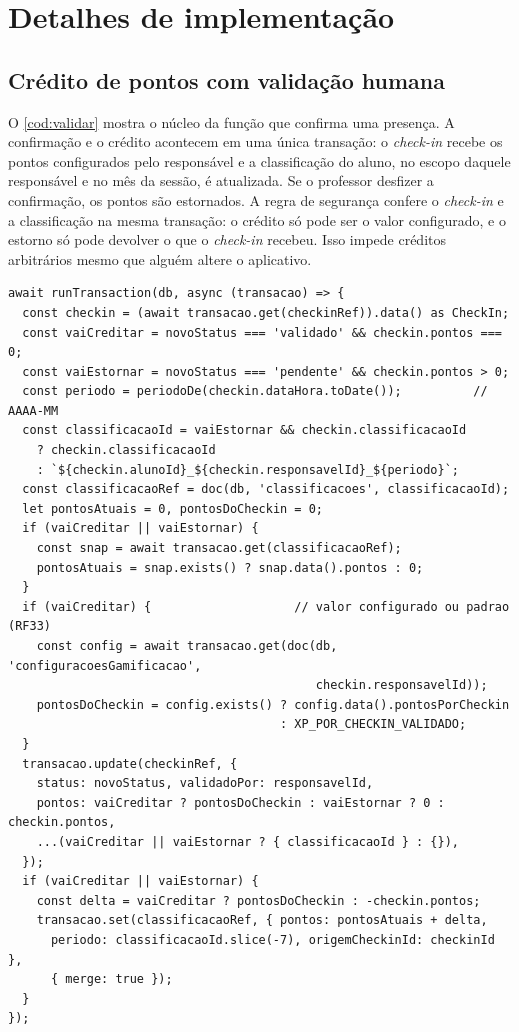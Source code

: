\section{Detalhes de implementação}

\subsection{Crédito de pontos com validação humana}

O \autoref{cod:validar} mostra o núcleo da função que confirma uma
presença. A confirmação e o crédito acontecem em uma única transação: o
\textit{check-in} recebe os pontos configurados pelo responsável e a
classificação do aluno, no escopo daquele responsável e no mês da sessão,
é atualizada. Se o professor desfizer a confirmação, os pontos são
estornados. A regra de segurança confere o \textit{check-in} e a
classificação na mesma transação: o crédito só pode ser o valor
configurado, e o estorno só pode devolver o que o \textit{check-in}
recebeu. Isso impede créditos arbitrários mesmo que alguém altere o
aplicativo.

\begin{codigo}[H]
  \caption{Validação de presença e crédito de pontos (TypeScript, trecho)}
  \label{cod:validar}
\begin{lstlisting}
await runTransaction(db, async (transacao) => {
  const checkin = (await transacao.get(checkinRef)).data() as CheckIn;
  const vaiCreditar = novoStatus === 'validado' && checkin.pontos === 0;
  const vaiEstornar = novoStatus === 'pendente' && checkin.pontos > 0;
  const periodo = periodoDe(checkin.dataHora.toDate());          // AAAA-MM
  const classificacaoId = vaiEstornar && checkin.classificacaoId
    ? checkin.classificacaoId
    : `${checkin.alunoId}_${checkin.responsavelId}_${periodo}`;
  const classificacaoRef = doc(db, 'classificacoes', classificacaoId);
  let pontosAtuais = 0, pontosDoCheckin = 0;
  if (vaiCreditar || vaiEstornar) {
    const snap = await transacao.get(classificacaoRef);
    pontosAtuais = snap.exists() ? snap.data().pontos : 0;
  }
  if (vaiCreditar) {                    // valor configurado ou padrao (RF33)
    const config = await transacao.get(doc(db, 'configuracoesGamificacao',
                                           checkin.responsavelId));
    pontosDoCheckin = config.exists() ? config.data().pontosPorCheckin
                                      : XP_POR_CHECKIN_VALIDADO;
  }
  transacao.update(checkinRef, {
    status: novoStatus, validadoPor: responsavelId,
    pontos: vaiCreditar ? pontosDoCheckin : vaiEstornar ? 0 : checkin.pontos,
    ...(vaiCreditar || vaiEstornar ? { classificacaoId } : {}),
  });
  if (vaiCreditar || vaiEstornar) {
    const delta = vaiCreditar ? pontosDoCheckin : -checkin.pontos;
    transacao.set(classificacaoRef, { pontos: pontosAtuais + delta,
      periodo: classificacaoId.slice(-7), origemCheckinId: checkinId },
      { merge: true });
  }
});
\end{lstlisting}

\end{codigo}

